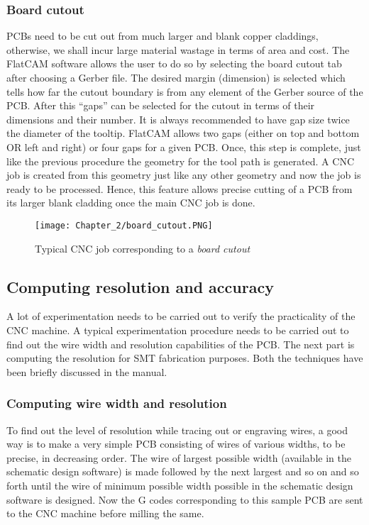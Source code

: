 \subsubsection*{Board cutout} \label{outline_cut}

PCBs need to be cut out from much larger and blank copper claddings, otherwise, we shall incur large material wastage in terms of area and cost. The FlatCAM software allows the user to do so by selecting the board cutout tab after choosing a Gerber file. The desired margin (dimension) is selected which tells how far the cutout boundary is from any element of the Gerber source of the PCB. After this “gaps” can be selected for the cutout in terms of their dimensions and their number. It is always recommended to have gap size twice the diameter of the tooltip. FlatCAM allows two gaps (either on top and bottom OR left and right) or four gaps for a given PCB. Once, this step is complete, just like the previous procedure the geometry for the tool path is generated. A CNC job is created from this geometry just like any other geometry and now the job is ready to be processed.  Hence, this feature allows precise cutting of a PCB from its larger blank cladding once the main CNC job is done.

\begin{figure}[h]
 \centering
 \texttt{[image: Chapter\_2/board\_cutout.PNG]}
 \caption{Typical CNC job corresponding to a \textit{board cutout}}
 \label{fig:board_cutout}
\end{figure}


\subsection{Computing resolution and accuracy} \label{res_and_acc}
A lot of experimentation needs to be carried out to verify the practicality of the CNC machine. A typical experimentation procedure needs to be carried out to find out the wire width and resolution capabilities of the PCB. The next part is computing the resolution for SMT fabrication purposes. Both the techniques have been briefly discussed in the manual.

\subsubsection*{Computing wire width and resolution}
To find out the level of resolution while tracing out or engraving wires, a good way is to make a very simple PCB consisting of wires of various widths, to be precise, in decreasing order. The wire of largest possible width (available in the schematic design software) is made followed by the next largest and so on and so forth until the wire of minimum possible width possible in the schematic design software is designed. Now the G codes corresponding to this sample PCB are sent to the CNC machine before milling the same. \par

